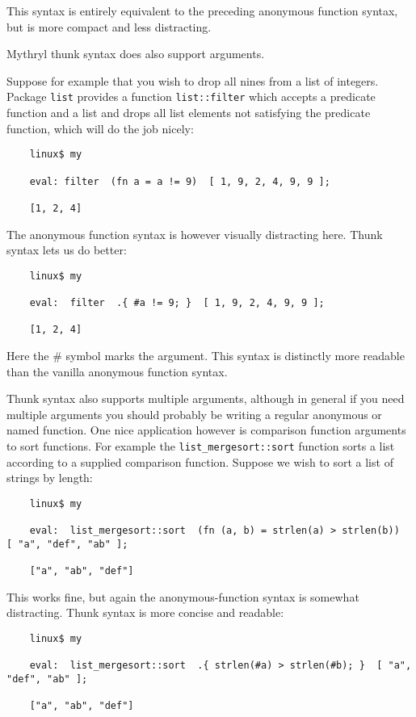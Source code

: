 This syntax is entirely equivalent to the preceding 
anonymous function syntax, but is more compact and 
less distracting.

Mythryl thunk syntax does also support arguments.

Suppose for example that you wish to drop all nines 
from a list of integers.  Package {\tt list} provides 
a function {\tt list::filter} which accepts a predicate 
function and a list and drops all list elements not 
satisfying the predicate function, which will do the 
job nicely:

\begin{verbatim}
    linux$ my

    eval: filter  (fn a = a != 9)  [ 1, 9, 2, 4, 9, 9 ];

    [1, 2, 4]
\end{verbatim}

The anonymous function syntax is however visually distracting 
here.  Thunk syntax lets us do better:

\begin{verbatim}
    linux$ my

    eval:  filter  .{ #a != 9; }  [ 1, 9, 2, 4, 9, 9 ];

    [1, 2, 4]
\end{verbatim}

Here the \# symbol marks the argument.  This syntax is 
distinctly more readable than the vanilla anonymous function 
syntax.

Thunk syntax also supports multiple arguments, although in 
general if you need multiple arguments you should probably 
be writing a regular anonymous or named function.  One 
nice application however is comparison function arguments 
to sort functions.  For example the {\tt list\_mergesort::sort} 
function sorts a list according to a supplied comparison 
function.  Suppose we wish to sort a list of strings by length:

\begin{verbatim}
    linux$ my

    eval:  list_mergesort::sort  (fn (a, b) = strlen(a) > strlen(b))  [ "a", "def", "ab" ]; 

    ["a", "ab", "def"]
\end{verbatim}

This works fine, but again the anonymous-function syntax is 
somewhat distracting.  Thunk syntax is more concise and readable:

\begin{verbatim}
    linux$ my

    eval:  list_mergesort::sort  .{ strlen(#a) > strlen(#b); }  [ "a", "def", "ab" ]; 

    ["a", "ab", "def"]
\end{verbatim}

